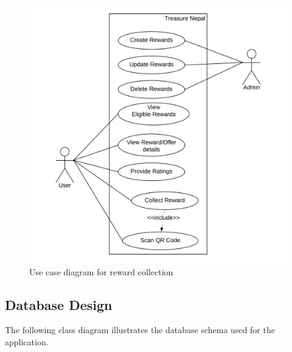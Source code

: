 \documentclass[12pt, a4paper, oneside]{article}
\begin{document}
\begin{figure}[H]
\includegraphics[width=\linewidth]{use-case-diagrams/reward.png}
\centering
\caption{Use case diagram for reward collection}
\label{fig:use-case-reward}
\end{figure}

\subsection{Database Design}
The following class diagram illustrates the database schema used for the application. 
\end{document}
